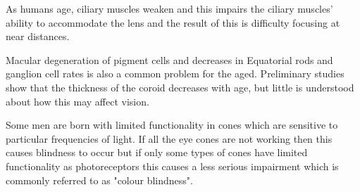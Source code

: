 As humans age, ciliary muscles weaken and this impairs the ciliary
muscles' ability to accommodate the lens and the result of this is
difficulty focusing at near distances.\cite{fisher1985ciliary}

Macular degeneration of pigment cells and decreases in Equatorial rods
and ganglion cell rates is also a common problem for the aged.
\cite{gao1992aging} Preliminary studies show that the thickness
of the coroid decreases with age, but little is understood about
how this may affect vision. \cite{margolis2009pilot}

Some men are born with limited functionality in cones which are
sensitive to particular frequencies of light.
If all the eye cones are not working then this causes blindness
to occur but if only some types of cones have limited functionality
as photoreceptors this causes a less serious impairment which is
commonly referred to as "colour blindness".\cite{george1996clinical}